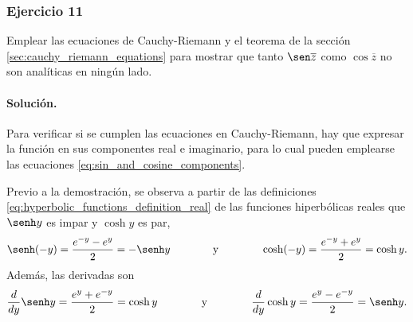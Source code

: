 \documentclass[a4paper]{report}
\begin{document}
\subsubsection{Ejercicio 11}

Emplear las ecuaciones de Cauchy-Riemann y el teorema de la sección \ref{sec:cauchy_riemann_equations} para mostrar que tanto \(\sen \overline{z}\) como \(\cos \overline{z}\) no son analíticas en ningún lado.

\paragraph{Solución.} Para verificar si se cumplen las ecuaciones en Cauchy-Riemann, hay que expresar la función en sus componentes real e imaginario, para lo cual pueden emplearse las ecuaciones \ref{eq:sin_and_cosine_components}. 

Previo a la demostración, se observa a partir de las definiciones \ref{eq:hyperbolic_functions_definition_real} de las funciones hiperbólicas reales que \(\senh y\) es impar y \(\cosh y\) es par,
\[
 \senh(-y)=\frac{e^{-y}-e^{y}}{2}=-\senh y
 \qquad\qquad\textrm{y}\qquad\qquad
 \cosh(-y)=\frac{e^{-y}+e^{y}}{2}=\cosh y.
\]
Además, las derivadas son 
\[
 \frac{d}{dy}\senh y=\frac{e^y+e^{-y}}{2}=\cosh y
 \qquad\qquad\textrm{y}\qquad\qquad
 \frac{d}{dy}\cosh y=\frac{e^y-e^{-y}}{2}=\senh y.
\]
\end{document}

